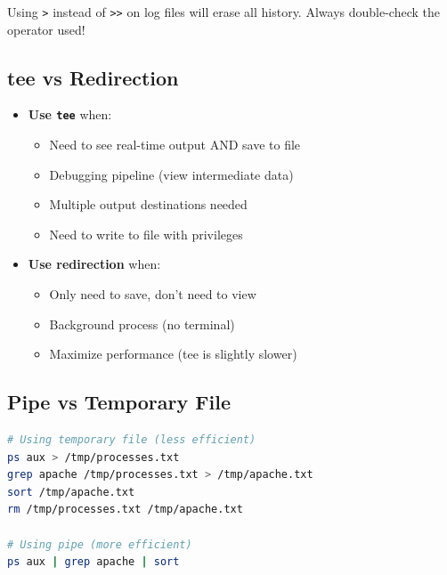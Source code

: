 \begin{warningbox}
	Using \texttt{>} instead of \texttt{>>} on log files will erase all history. Always double-check the operator used!
\end{warningbox}

\subsection{tee vs Redirection}

\begin{itemize}
	\item \textbf{Use \texttt{tee}} when:
	      \begin{itemize}
		      \item Need to see real-time output AND save to file
		      \item Debugging pipeline (view intermediate data)
		      \item Multiple output destinations needed
		      \item Need to write to file with  privileges
	      \end{itemize}

	\item \textbf{Use redirection} when:
	      \begin{itemize}
		      \item Only need to save, don't need to view
		      \item Background process (no terminal)
		      \item Maximize performance (tee is slightly slower)
	      \end{itemize}
\end{itemize}

\subsection{Pipe vs Temporary File}

\begin{examplebox}
	\begin{lstlisting}[language=bash]
# Using temporary file (less efficient)
ps aux > /tmp/processes.txt
grep apache /tmp/processes.txt > /tmp/apache.txt
sort /tmp/apache.txt
rm /tmp/processes.txt /tmp/apache.txt

# Using pipe (more efficient)
ps aux | grep apache | sort
\end{lstlisting}
\end{examplebox}

